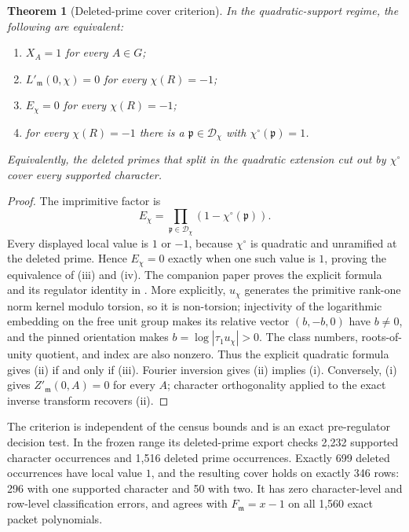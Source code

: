 \documentclass[11pt]{article}
\newtheorem{theorem}{Theorem}
\begin{document}
\begin{theorem}[Deleted-prime cover criterion]\label{thm:cover}
In the quadratic-support regime, the following are equivalent:
\begin{enumerate}
\renewcommand{\theenumi}{\roman{enumi}}
\renewcommand{\labelenumi}{(\theenumi)}
\item $X_A=1$ for every $A\in G$;
\item $L'_{\mathfrak m}(0,\chi)=0$ for every $\chi(R)=-1$;
\item $E_\chi=0$ for every $\chi(R)=-1$;
\item for every $\chi(R)=-1$ there is a
      $\mathfrak p\in\mathcal D_\chi$ with
      $\chi^\circ(\mathfrak p)=1$.
\end{enumerate}
Equivalently, the deleted primes that split in the quadratic extension
cut out by $\chi^\circ$ cover every supported character.
\end{theorem}

\begin{proof}
The imprimitive factor is
\[
 E_\chi=\prod_{\mathfrak p\in\mathcal D_\chi}
              (1-\chi^\circ(\mathfrak p)).
\]
Every displayed local value is $1$ or $-1$, because $\chi^\circ$ is
quadratic and unramified at the deleted prime.  Hence $E_\chi=0$ exactly
when one such value is $1$, proving the equivalence of (iii) and (iv).
The companion paper proves the explicit formula and its regulator
identity in \cite[Prop.~4 and Eq.~(9)]{ZhaoResults}.  More explicitly,
$u_\chi$ generates the primitive rank-one norm kernel modulo torsion,
so it is non-torsion; injectivity of the logarithmic embedding on the
free unit group makes its relative vector $(b,-b,0)$ have $b\ne0$, and
the pinned orientation makes $b=\log|\tau_1u_\chi|>0$.  The class
numbers, roots-of-unity quotient, and index are also nonzero.  Thus the
explicit quadratic formula gives (ii) if and only if (iii).  Fourier
inversion gives (ii) implies (i).  Conversely, (i) gives
$Z'_{\mathfrak m}(0,A)=0$ for every $A$; character orthogonality applied
to the exact inverse transform recovers (ii).
\end{proof}

The criterion is independent of the census bounds and is an exact
pre-regulator decision test.  In the frozen range its deleted-prime
export checks 2,232 supported character occurrences and 1,516 deleted
prime occurrences.  Exactly 699 deleted occurrences have local value
$1$, and the resulting cover holds on exactly 346 rows: 296 with one
supported character and 50 with two.  It has zero character-level and
row-level classification errors, and agrees with $F_{\mathfrak m}=x-1$
on all 1,560 exact packet polynomials.
\end{document}

